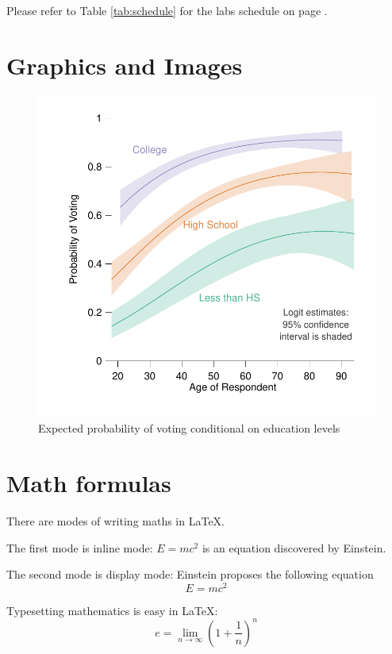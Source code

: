\documentclass[12pt, a4paper]{article}
\begin{document}
Please refer to Table \ref{tab:schedule} for the labs schedule on page \pageref{tab:schedule}.

\section{Graphics and Images}
\begin{figure}[t]
    \centering
    \includegraphics{figure/educationEV.pdf}
    \caption{Expected probability of voting conditional on education levels}
    \label{fig:edu}
\end{figure}

\section{Math formulas}
There are modes of writing maths in \LaTeX{}. 

The first mode is inline mode: $E = mc^2$ is an equation discovered by Einstein.

The second mode is display mode: Einstein proposes the following equation
\begin{equation}
E = mc^2
\end{equation}

Typesetting mathematics is easy in \LaTeX{}:
\begin{equation}
    e = \lim_{n \to \infty} \left( 1 + \frac{1}{n} \right)^n
\end{equation}
\end{document}
